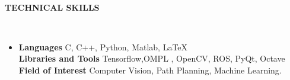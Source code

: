 \documentclass[a4paper,10pt]{article}
\newcommand{\lsep}{-0.5cm}
\newcommand{\resheading}[1]{{\small \colorbox{mygrey}{\begin{minipage}{0.975\textwidth}{\textbf{#1 \vphantom{p\^{E}}}}\end{minipage}}}}
\begin{document}
\hspace{0.5cm}\\[-0.2cm]
\resheading{\textbf{TECHNICAL SKILLS} }\\[\lsep]
\begin{itemize}
\item \noindent \textbf{Languages} C, C++, Python, Matlab, {\LaTeX{}} \\
\textbf{Libraries and Tools} Tensorflow,OMPL , OpenCV, ROS, PyQt, Octave \\
\textbf{Field of Interest} Computer Vision, Path Planning, Machine Learning. \\
\end{itemize}
\end{document}
